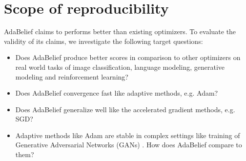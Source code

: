 \section{Scope of reproducibility}
\label{sec:claims}



AdaBelief \cite{zhuang_adabelief_2020} claims to performs better than existing optimizers. To evaluate the  validity of its claims, we investigate the following target questions:

\begin{itemize}
    \item Does AdaBelief produce better scores in comparison to other optimizers on real world tasks of image classification, language modeling, generative modeling and reinforcement learning?
    \item Does AdaBelief convergence fast like adaptive methods, e.g. Adam?
    \item Does AdaBelief generalize well like the accelerated gradient methods, e.g. SGD?
    \item Adaptive methods like Adam are stable in complex settings like training of Generative Adversarial Networks (GANs) \cite{GAN}. How does AdaBelief compare to them?
\end{itemize}


